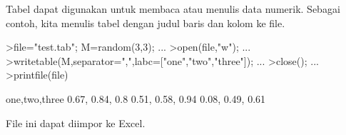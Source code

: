 \documentclass[a4paper,10pt]{article}
\begin{document}
\begin{eulernotebook}
\begin{eulercomment}
\begin{eulercomment}
\begin{eulercomment}
\begin{eulercomment}
\begin{eulercomment}
\begin{eulercomment}
\begin{eulercomment}
\begin{eulercomment}
\begin{eulercomment}
\begin{eulercomment}
\begin{eulercomment}
\begin{eulercomment}
\begin{eulercomment}
\begin{eulercomment}
\begin{eulercomment}
\begin{eulercomment}
\begin{eulercomment}
\begin{eulercomment}
\begin{eulercomment}
\begin{eulercomment}
\begin{eulercomment}
\begin{eulercomment}
\begin{eulercomment}
\begin{eulercomment}
\begin{euleroutput}
\end{euleroutput}
\begin{eulercomment}
Tabel dapat digunakan untuk membaca atau menulis data numerik. Sebagai
contoh, kita menulis tabel dengan judul baris dan kolom ke file.
\end{eulercomment}
\begin{eulerprompt}
>file="test.tab"; M=random(3,3);  ...
>open(file,"w");  ...
>writetable(M,separator=",",labc=["one","two","three"]);  ...
>close(); ...
>printfile(file)
\end{eulerprompt}
\begin{euleroutput}
  one,two,three
        0.67,      0.84,       0.8
        0.51,      0.58,      0.94
        0.08,      0.49,      0.61
\end{euleroutput}
\begin{eulercomment}
File ini dapat diimpor ke Excel.


\end{eulercomment}
\end{eulercomment}
\end{eulercomment}
\end{eulercomment}
\end{eulercomment}
\end{eulercomment}
\end{eulercomment}
\end{eulercomment}
\end{eulercomment}
\end{eulercomment}
\end{eulercomment}
\end{eulercomment}
\end{eulercomment}
\end{eulercomment}
\end{eulercomment}
\end{eulercomment}
\end{eulercomment}
\end{eulercomment}
\end{eulercomment}
\end{eulercomment}
\end{eulercomment}
\end{eulercomment}
\end{eulercomment}
\end{eulercomment}
\end{eulercomment}
\end{eulernotebook}
\end{document}
